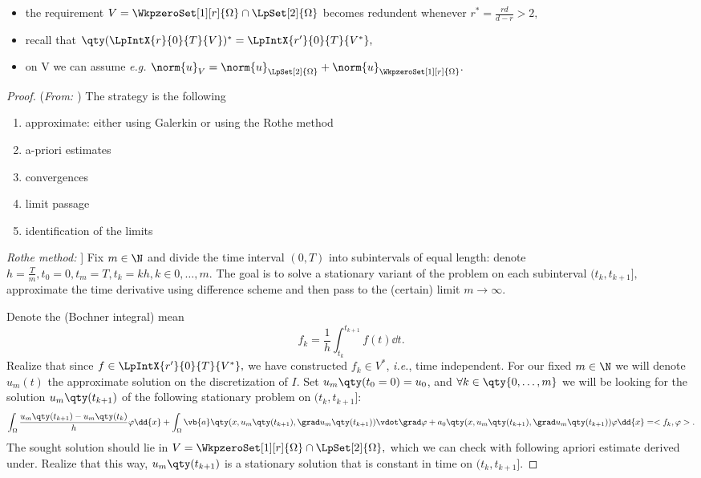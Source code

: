 	\begin{remark}
	    \begin{itemize}
		    \item the requirement $V = \WkpzeroSet[1][r]{\Omega} \cap \LpSet[2]{\Omega}$ becomes redundent whenever $r^{*} = \frac{rd}{d-r} >2,$ 
		    \item recall that $\qty(\LpIntX{r}{0}{T}{V})^{*} = \LpIntX{r'}{0}{T}{V^{*}},$ 
		    \item on V we can assume \textit{e.g.} $\norm{u}_V = \norm{u}_{\LpSet[2]{\Omega}} + \norm{u}_{\WkpzeroSet[1][r]{\Omega}}.$
	    \end{itemize}
	\end{remark}
	\begin{proof}(\textit{From: \cite{bulicekUvodModerniTeorie2018}})
	The strategy is the following 
	\begin{enumerate}
		\item approximate: either using Galerkin or using the Rothe method
		\item a-priori estimates
		\item convergences
		\item limit passage
		\item identification of the limits
	\end{enumerate}
	

	\textit{Rothe method:} ]
	Fix $m \in \N$ and divide the time interval $(0,T)$ into subintervals of equal length: denote $h = \frac{T}{m}, t_0 =0, t_m = T , t_k = kh, k \in {0,\dots, m}.$ The goal is to solve a stationary variant of the problem on each subinterval $(t_{k}, t_{k+1}],$ approximate the time derivative using difference scheme and then pass to the (certain) limit $m \to \infty.$

	Denote the (Bochner integral) mean
	\[
		f_k = \frac{1}{h} \int_{t_k}^{t_{k+1}}f(t)\dd{t}. 
	\]
	Realize that since $f \in \LpIntX{r'}{0}{T}{V^{*}},$ we have constructed $f_k \in V^{*}$, \textit{i.e.}, time independent. For our fixed $m \in \N$ we will denote $u_m(t)$ the approximate solution on the discretization of $I$. Set $u_m\qty(t_0 = 0) = u_0$, and $\forall k \in \qty{0, \dots, m}$ we will be looking for the solution $u_m\qty(t_{k+1})$ of the following stationary problem on $(t_k, t_{k+1}]$:
	\[
		\int_{\Omega}\frac{u_m\qty(t_{k+1})- u_m\qty(t_k)}{h}\varphi\dd{x} + \int_{\Omega}\vb{a}\qty(x, u_m\qty(t_{k+1}), \grad u_m\qty(t_{k+1})) \vdot \grad \varphi + a_0\qty(x, u_m\qty(t_{k+1}), \grad u_m\qty(t_{k+1})) \varphi \dd{x} = <f_{k}, \varphi>.
	\]
The sought solution should lie in $V = \WkpzeroSet[1][r]{\Omega} \cap \LpSet[2]{\Omega},$ which we can check with following apriori estimate derived under. Realize that this way, $u_m\qty(t_{k+1})$ is a stationary solution that is constant in time on $(t_k, t_{k+1}].$ 


\end{proof}

